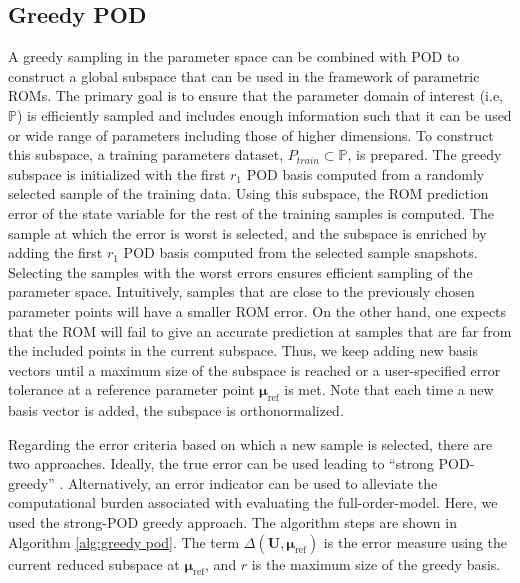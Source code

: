 \documentclass[review,number,sort&compress,12pt]{elsarticle}
\begin{document}

\subsection{Greedy POD}
\label{sec:greedy}

A greedy sampling in the parameter space \cite{nguyen2009reduced} can be combined with POD to construct a global subspace that can be used in the framework of parametric ROMs.
The primary goal is to ensure that the parameter domain of interest (i.e, $\mathbb P$) is efficiently sampled and includes enough information such that it can be used or wide range of parameters including those of higher dimensions.
To construct this subspace, a training parameters dataset, $P_{train} \subset \mathbb P$, is prepared. 
The greedy subspace is initialized with the first $r_1$ POD basis computed from a randomly selected sample of the training data.
Using this subspace, the ROM prediction error of the state variable for the rest of the training samples is computed.
The sample at which the error is worst is selected, and the subspace is enriched by adding the first $r_1$ POD basis computed from the selected sample snapshots.
Selecting the samples with the worst errors ensures efficient sampling of the parameter space.
Intuitively, samples that are close to the previously chosen parameter points will have a smaller ROM error.
On the other hand, one expects that the ROM will fail to give an accurate prediction at samples that are far from the included points in the current subspace.
Thus, we keep adding new basis vectors until a maximum size of the subspace is reached or a user-specified error tolerance at a reference parameter point $\boldsymbol{\mu}_{\text{ref}}$ is met.
Note that each time a new basis vector is added, the subspace is orthonormalized.

Regarding the error criteria based on which a new sample is selected, there are two approaches. 
Ideally, the true error can be used leading to ``strong POD-greedy'' \cite{benner2017model}.
Alternatively, an error indicator can be used to alleviate the computational burden associated with evaluating the full-order-model. 
Here, we used the strong-POD greedy approach. 
The algorithm steps are shown in Algorithm \ref{alg:greedy pod}. 
The term $\Delta(\textbf{U},\boldsymbol{\mu}_\text{ref})$  is the error measure using the current reduced subspace at $\boldsymbol{\mu}_\text{ref}$, and $r$ is the maximum size of the greedy basis.
\end{document}
